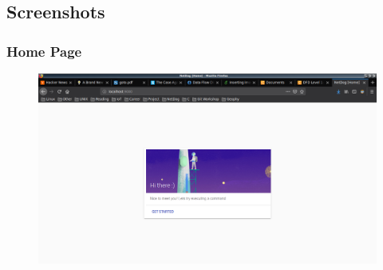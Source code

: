 \subsection{Screenshots}

\subsubsection{Home Page}

\begin{figure}[H]
\includegraphics[scale=0.3]{netdog_home}
\end{figure}
